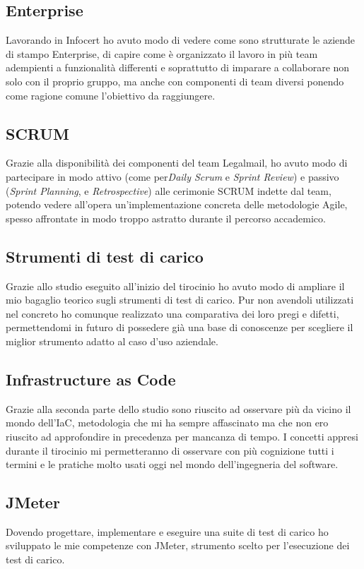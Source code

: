 \subsection{Enterprise}
Lavorando in Infocert ho avuto modo di vedere come sono strutturate le aziende di stampo Enterprise, di capire come è organizzato il lavoro in più team adempienti a funzionalità differenti e soprattutto di imparare a collaborare non solo con il proprio gruppo, ma anche con componenti di team diversi ponendo come ragione comune l'obiettivo da raggiungere.
\subsection{SCRUM}
Grazie alla disponibilità dei componenti del team Legalmail, ho avuto modo di partecipare in modo attivo (come per\textit{Daily Scrum} e \textit{Sprint Review}) e passivo (\textit{Sprint Planning}, e \textit{Retrospective}) alle cerimonie SCRUM indette dal team, potendo vedere all'opera un'implementazione concreta delle metodologie Agile, spesso affrontate in modo troppo astratto durante il percorso accademico.
\subsection{Strumenti di test di carico}
Grazie allo studio eseguito all'inizio del tirocinio ho avuto modo di ampliare il mio bagaglio teorico sugli strumenti di test di carico. Pur non avendoli utilizzati nel concreto ho comunque realizzato una comparativa dei loro pregi e difetti, permettendomi in futuro di possedere già una base di conoscenze per scegliere il miglior strumento adatto al caso d'uso aziendale.
\subsection{Infrastructure as Code}
Grazie alla seconda parte dello studio sono riuscito ad osservare più da vicino il mondo dell'IaC, metodologia che mi ha sempre affascinato ma che non ero riuscito ad approfondire in precedenza per mancanza di tempo. I concetti appresi durante il tirocinio mi permetteranno di osservare con più cognizione tutti i termini e le pratiche molto usati oggi nel mondo dell'ingegneria del software. 
\subsection{JMeter}
Dovendo progettare, implementare e eseguire una suite di test di carico ho sviluppato le mie competenze con JMeter, strumento scelto per l'esecuzione dei test di carico.

